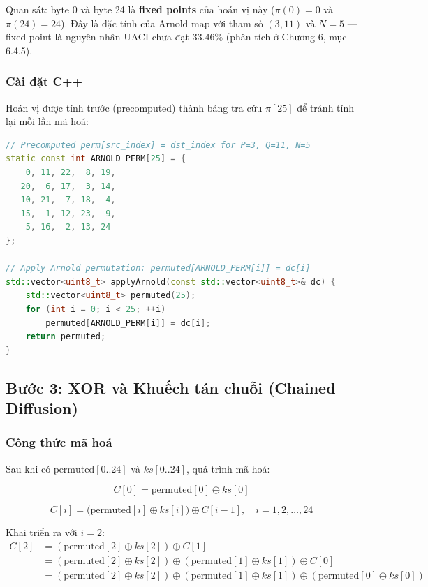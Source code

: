 Quan sát: byte 0 và byte 24 là \textbf{fixed points} của hoán vị này
($\pi(0) = 0$ và $\pi(24) = 24$). Đây là đặc tính của Arnold map với tham số
$(3, 11)$ và $N = 5$ --- fixed point là nguyên nhân UACI chưa đạt $33.46\%$
(phân tích ở Chương 6, mục 6.4.5).

\subsubsection{Cài đặt C++}

Hoán vị được tính trước (precomputed) thành bảng tra cứu $\pi[25]$ để tránh
tính lại mỗi lần mã hoá:

\begin{lstlisting}[language=C++, caption={Precomputed Arnold permutation --- \texttt{hybrid\_encryption.cpp}}]
// Precomputed perm[src_index] = dst_index for P=3, Q=11, N=5
static const int ARNOLD_PERM[25] = {
    0, 11, 22,  8, 19,
   20,  6, 17,  3, 14,
   10, 21,  7, 18,  4,
   15,  1, 12, 23,  9,
    5, 16,  2, 13, 24
};

// Apply Arnold permutation: permuted[ARNOLD_PERM[i]] = dc[i]
std::vector<uint8_t> applyArnold(const std::vector<uint8_t>& dc) {
    std::vector<uint8_t> permuted(25);
    for (int i = 0; i < 25; ++i)
        permuted[ARNOLD_PERM[i]] = dc[i];
    return permuted;
}
\end{lstlisting}

\subsection{Bước 3: XOR và Khuếch tán chuỗi (Chained Diffusion)}

\subsubsection{Công thức mã hoá}

Sau khi có $\text{permuted}[0..24]$ và $ks[0..24]$, quá trình mã hoá:

\begin{equation}
C[0] = \text{permuted}[0] \oplus ks[0]
\label{eq:c0}
\end{equation}

\begin{equation}
C[i] = \bigl(\text{permuted}[i] \oplus ks[i]\bigr) \oplus C[i-1], \quad i = 1, 2, \ldots, 24
\label{eq:chained_diffusion}
\end{equation}

Khai triển ra với $i = 2$:
\begin{align}
C[2] &= (\text{permuted}[2] \oplus ks[2]) \oplus C[1] \\
     &= (\text{permuted}[2] \oplus ks[2]) \oplus (\text{permuted}[1] \oplus ks[1]) \oplus C[0] \\
     &= (\text{permuted}[2] \oplus ks[2]) \oplus (\text{permuted}[1] \oplus ks[1]) \oplus (\text{permuted}[0] \oplus ks[0])
\end{align}

